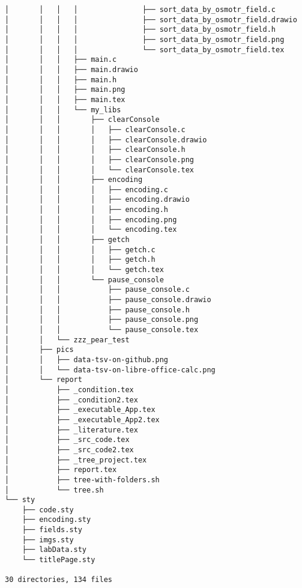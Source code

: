 \begin{verbatim}
│       │   │   │               ├── sort_data_by_osmotr_field.c
│       │   │   │               ├── sort_data_by_osmotr_field.drawio
│       │   │   │               ├── sort_data_by_osmotr_field.h
│       │   │   │               ├── sort_data_by_osmotr_field.png
│       │   │   │               └── sort_data_by_osmotr_field.tex
│       │   │   ├── main.c
│       │   │   ├── main.drawio
│       │   │   ├── main.h
│       │   │   ├── main.png
│       │   │   ├── main.tex
│       │   │   └── my_libs
│       │   │       ├── clearConsole
│       │   │       │   ├── clearConsole.c
│       │   │       │   ├── clearConsole.drawio
│       │   │       │   ├── clearConsole.h
│       │   │       │   ├── clearConsole.png
│       │   │       │   └── clearConsole.tex
│       │   │       ├── encoding
│       │   │       │   ├── encoding.c
│       │   │       │   ├── encoding.drawio
│       │   │       │   ├── encoding.h
│       │   │       │   ├── encoding.png
│       │   │       │   └── encoding.tex
│       │   │       ├── getch
│       │   │       │   ├── getch.c
│       │   │       │   ├── getch.h
│       │   │       │   └── getch.tex
│       │   │       └── pause_console
│       │   │           ├── pause_console.c
│       │   │           ├── pause_console.drawio
│       │   │           ├── pause_console.h
│       │   │           ├── pause_console.png
│       │   │           └── pause_console.tex
│       │   └── zzz_pear_test
│       ├── pics
│       │   ├── data-tsv-on-github.png
│       │   └── data-tsv-on-libre-office-calc.png
│       └── report
│           ├── _condition.tex
│           ├── _condition2.tex
│           ├── _executable_App.tex
│           ├── _executable_App2.tex
│           ├── _literature.tex
│           ├── _src_code.tex
│           ├── _src_code2.tex
│           ├── _tree_project.tex
│           ├── report.tex
│           ├── tree-with-folders.sh
│           └── tree.sh
└── sty
    ├── code.sty
    ├── encoding.sty
    ├── fields.sty
    ├── imgs.sty
    ├── labData.sty
    └── titlePage.sty

30 directories, 134 files
\end{verbatim}